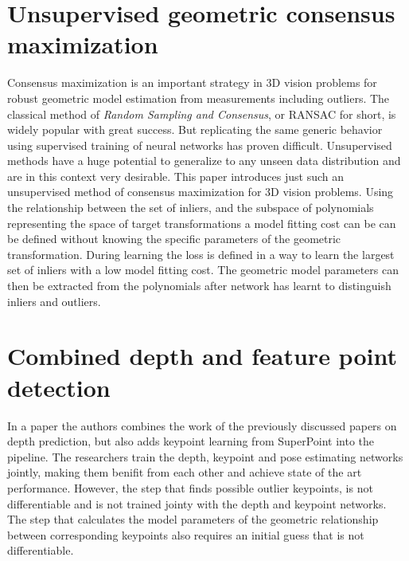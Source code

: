 \section{Unsupervised geometric consensus maximization}

Consensus maximization is an important strategy in 3D vision problems for robust geometric model estimation from measurements including outliers. The classical method of \textit{Random Sampling and Consensus}, or RANSAC\cite{ransac} for short, is widely popular with great success. But replicating the same generic behavior using supervised training of neural networks has proven difficult. Unsupervised methods have a huge potential to generalize to any unseen data distribution and are in this context very desirable. This paper\cite{consensus} introduces just such an unsupervised method of consensus maximization for 3D vision problems. Using the relationship between the set of inliers, and the subspace of polynomials representing the space of target transformations a model fitting cost can be can be defined without knowing the specific parameters of the geometric transformation. During learning the loss is defined in a way to learn the largest set of inliers with a low model fitting cost. The geometric model parameters can then be extracted from the polynomials after network has learnt to distinguish inliers and outliers.

\section{Combined depth and feature point detection}

In a paper\cite{keypointdepth} the authors combines the work of the previously discussed papers on depth prediction, but also adds keypoint learning from SuperPoint\cite{superpoint} into the pipeline. The researchers train the depth, keypoint and pose estimating networks jointly, making them benifit from each other and achieve state of the art performance.  However, the step that finds possible outlier keypoints, is not differentiable and is not trained jointy with the depth and keypoint networks. The step that calculates the model parameters of the geometric relationship between corresponding keypoints also requires an initial guess that is not differentiable.

